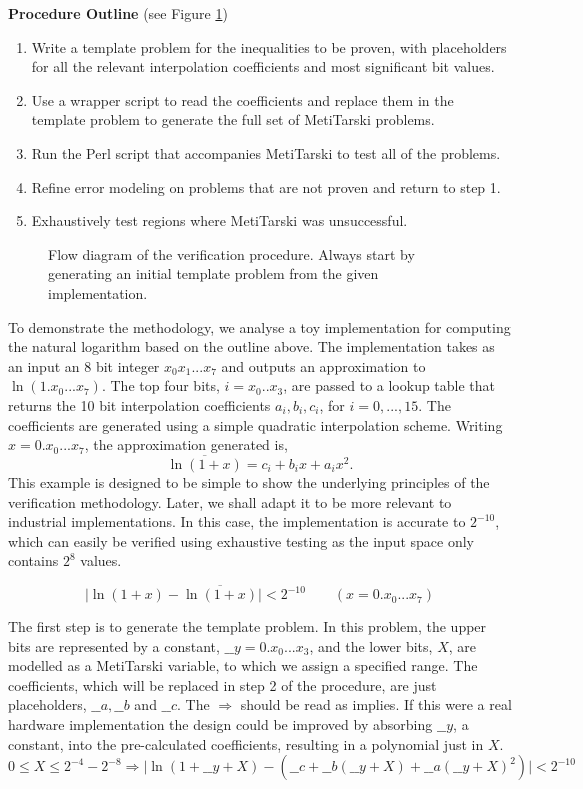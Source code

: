 \documentclass{fac}
\newcommand{\abs}[1]{\lvert#1\rvert}
\begin{document}
\noindent\textbf{Procedure Outline} (see Figure \ref{procedure_flow})
\begin{enumerate}
\item Write a template problem for the inequalities to be proven, with placeholders for all the relevant interpolation coefficients and most significant bit values.
\item Use a wrapper script to read the coefficients and replace them in the template problem to generate the full set of MetiTarski problems.
\item Run the Perl script that accompanies MetiTarski to test all of the problems.
\item Refine error modeling on problems that are not proven and return to step 1.
\item Exhaustively test regions where MetiTarski was unsuccessful.
\end{enumerate}  

\begin{figure} 
\centering

\caption{Flow diagram of the verification procedure. Always start by generating an initial template problem from the given implementation.}
\label{procedure_flow}
\end{figure}

To demonstrate the methodology, we analyse a toy implementation for computing the natural logarithm based on the outline above. The implementation takes as an input an 8 bit integer $x_0x_1...x_7$ and outputs an approximation to $\ln(1.x_0...x_7)$. The top four bits, $i = x_0..x_3$, are passed to a lookup table that returns the 10 bit interpolation coefficients $a_i, b_i, c_i$, for $i=0,...,15$. The coefficients are generated using a simple quadratic interpolation scheme. Writing $x=0.x_0...x_7$, the approximation generated is,
\[ \overline{\ln(1+x)}=c_i + b_i x +a_i x^2. \]
This example is designed to be simple to show the underlying principles of the verification methodology. Later, we shall adapt it to be more relevant to industrial implementations. In this case, the implementation is accurate to $2^{-10}$, which can easily be verified using exhaustive testing as the input space only contains $2^8$ values.

\[\abs{\ln(1+x)-\overline{\ln(1+x)}} <2^{-10} \qquad (x= 0.x_0...x_7) \]

The first step is to generate the template problem. In this problem, the upper bits are represented by a constant, $\_\_y=0.x_0...x_3$, and the lower bits, $X$, are modelled as a MetiTarski variable, to which we assign a specified range. The coefficients, which will be replaced in step 2 of the procedure, are just placeholders, $\_\_a, \_\_b$ and $\_\_c$. The $\Rightarrow$ should be read as implies. If this were a real hardware implementation the design could be improved by absorbing $\_\_y$, a constant, into the pre-calculated coefficients, resulting in a polynomial just in $X$.
\[ 0\le X \le 2^{-4}-2^{-8} \Rightarrow \abs{\ln(1+\_\_y+X)-(\_\_c+\_\_b(\_\_y+X)+\_\_a(\_\_y+X)^2)} < 2^{-10} \]
\end{document}
